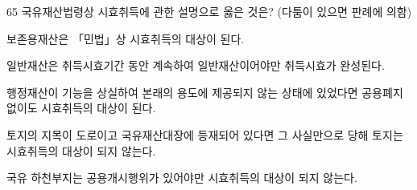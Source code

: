 \begin{question}{65}
국유재산법령상 시효취득에 관한 설명으로 옳은 것은? (다툼이 있으면 판례에 의함)
\begin{choices}
  \item 보존용재산은 「민법」상 시효취득의 대상이 된다.
  \item 일반재산은 취득시효기간 동안 계속하여 일반재산이어야만 취득시효가 완성된다.
  \item 행정재산이 기능을 상실하여 본래의 용도에 제공되지 않는 상태에 있었다면 공용폐지 없이도 시효취득의 대상이 된다.
  \item 토지의 지목이 도로이고 국유재산대장에 등재되어 있다면 그 사실만으로 당해 토지는 시효취득의 대상이 되지 않는다.
  \item 국유 하천부지는 공용개시행위가 있어야만 시효취득의 대상이 되지 않는다.
\end{choices}
\end{question}
